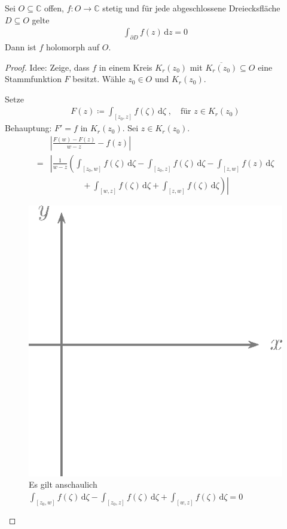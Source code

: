\documentclass[a4paper,10pt]{scrbook}
\begin{document}
\begin{theorem}
  Sei $O \subseteq \mathbb{C}$ offen, $f:O \to \mathbb{C}$ stetig und für jede abgeschlossene Dreiecksfläche $D \subseteq O$ gelte
  \begin{align*}
    \int_{\partial D} f(z) \, \mathrm{d}z = 0
  \end{align*}
  Dann ist $f$ holomorph auf $O$.

  \begin{proof}
    Idee: Zeige, dass $f$ in einem Kreis $K_r(z_0)$ mit $\overline{K_r(z_0)} \subseteq O$ eine Stammfunktion $F$ besitzt. Wähle $z_0 \in O$ und $K_r(z_0)$.

    Setze
    \begin{align*}
      F(z) \coloneq \int_{[z_0,z]} f(\zeta) \, \mathrm{d}\zeta \; , \quad \text{für } z \in K_r(z_0)
    \end{align*}
    Behauptung: $F' = f$ in $K_r(z_0)$. Sei $z \in K_r(z_0)$.
    \begin{align*}
       & \left| \frac{F(w) - F(z)}{w - z} - f(z) \right| \\
      =& \left| \frac{1}{w - z} \left( \int_{[z_0,w]} f(\zeta) \, \mathrm{d}\zeta - \int_{[z_0,z]} f(\zeta) \, \mathrm{d}\zeta - \int_{[z,w]} f(z) \, \mathrm{d}\zeta \right. \right. \\
        & \left. \left. \phantom{\frac{1}{w - z} \qquad} + \int_{[w,z]} f(\zeta) \, \mathrm{d}\zeta + \int_{[z,w]} f(\zeta) \, \mathrm{d}\zeta \right) \right|
    \end{align*}

    \begin{figure}[H]
      \centering
      \caption{Es gilt anschaulich $\int_{[z_0,w]} f(\zeta) \, \mathrm{d}\zeta - \int_{[z_0,z]} f(\zeta) \, \mathrm{d}\zeta + \int_{[w,z]} f(\zeta) \, \mathrm{d}\zeta = 0$}
      \includegraphics[scale=0.2]{images/ana3-tmp-21}
    \end{figure}


\end{proof}
\end{theorem}
\end{document}

